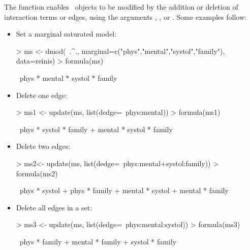\documentclass[12pt]{article}
\begin{document}
The  function enables \dmodo\ objects to be modified by the addition
or deletion of interaction terms or edges, using the arguments , ,
 or . Some examples follow:


\begin{itemize}
\item Set a marginal saturated model:

\begin{Schunk}
\begin{Sinput}
> ms <- dmod(~.^., marginal=c("phys","mental","systol","family"), data=reinis)
> formula(ms)
\end{Sinput}
\begin{Soutput}
~phys * mental * systol * family
\end{Soutput}
\end{Schunk}

\item Delete one edge:

\begin{Schunk}
\begin{Sinput}
> ms1 <- update(ms, list(dedge=~phys:mental))
> formula(ms1)
\end{Sinput}
\begin{Soutput}
~phys * systol * family + mental * systol * family
\end{Soutput}
\end{Schunk}

\item Delete two edges:

\begin{Schunk}
\begin{Sinput}
> ms2<- update(ms, list(dedge=~phys:mental+systol:family))
> formula(ms2)
\end{Sinput}
\begin{Soutput}
~phys * systol + phys * family + mental * systol + mental * family
\end{Soutput}
\end{Schunk}

\item Delete all edges in a set:

\begin{Schunk}
\begin{Sinput}
> ms3 <- update(ms, list(dedge=~phys:mental:systol))
> formula(ms3)
\end{Sinput}
\begin{Soutput}
~phys * family + mental * family + systol * family
\end{Soutput}
\end{Schunk}


\end{itemize}
\end{document}
